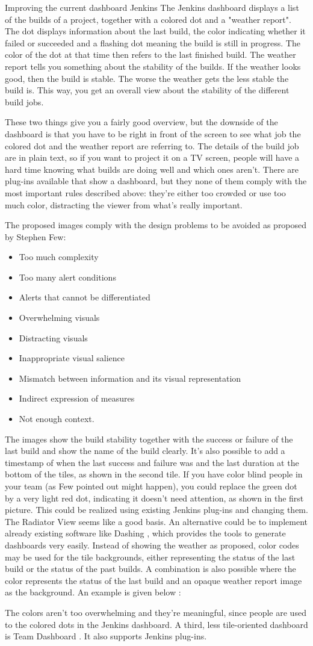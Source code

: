 \documentclass[10pt,a4paper]{report}
\begin{document}
Improving the current dashboard
Jenkins
The Jenkins dashboard displays a list of the builds of a project, together with a colored dot and a "weather report". The dot displays information about the last build, the color indicating whether it failed or succeeded and a flashing dot meaning the build is still in progress. 
The color of the dot at that time then refers to the last finished build.
The weather report tells you something about the stability of the builds. If the weather looks good, then the build is stable. The worse the weather gets the less stable the build is. This way, you get an overall view about the stability of the different build jobs.
 
These two things give you a fairly good overview, but the downside of the dashboard is that you have to be right in front of the screen to see what job the colored dot and the weather report are referring to. 
The details of the build job are in plain text, so if you want to project it on a TV screen, people will have a hard time knowing what builds are doing well and which ones aren't.
There are plug-ins available that show a dashboard, but they none of them comply with the most important rules described above: they're either too crowded or use too much color, distracting the viewer from what's really important.
  
The proposed images comply with the design problems to be avoided as proposed by Stephen Few:
\begin{itemize}
\item Too much complexity
\item Too many alert conditions
\item Alerts that cannot be differentiated
\item Overwhelming visuals
\item Distracting visuals
\item Inappropriate visual salience
\item Mismatch between information and its visual representation
\item Indirect expression of measures
\item Not enough context.
\end{itemize}
The images show the build stability together with the success or failure of the last build and show the name of the build clearly. It's also possible to add a timestamp of when the last success and failure was and the last duration at the bottom of the tiles, as shown in the second tile. If you have color blind people in your team (as Few pointed out might happen), you could replace the green dot by a very light red dot, indicating it doesn't need attention, as shown in the first picture.
This could be realized using existing Jenkins plug-ins and changing them. The Radiator View  seems like a good basis.
An alternative could be to implement already existing software like Dashing , which provides the tools to generate dashboards very easily. Instead of showing the weather as proposed, color codes may be used for the tile backgrounds, either representing the status of the last build or the status of the past builds. A combination is also possible where the color represents the status of the last build and an opaque weather report image as the background. An example is given below :
 
The colors aren’t too overwhelming and they’re meaningful, since people are used to the colored dots in the Jenkins dashboard. 
A third, less tile-oriented dashboard is Team Dashboard . It also supports Jenkins plug-ins.
\end{document}
